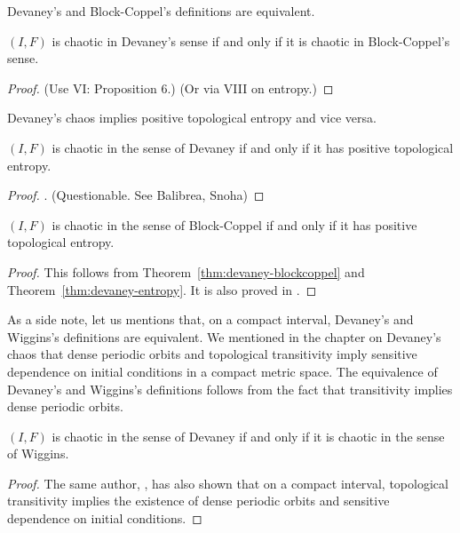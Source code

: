 \documentclass[12pt,twoside,draft]{book}
\begin{document}
Devaney's and Block-Coppel's definitions are equivalent.
\begin{theorem}
  \citep{aulbach}
  $(I,F)$ is chaotic in Devaney's sense if and only if it is chaotic in Block-Coppel's sense.
  \begin{proof}
    \citep{aulbach}
    (Use \citep{blockcoppel} VI: Proposition 6.)
    (Or via \citep{blockcoppel} VIII on entropy.)
  \end{proof}
  \label{thm:devaney-blockcoppel}
\end{theorem}

Devaney's chaos implies positive topological entropy and vice versa.
\begin{theorem}
  \citep{forti}
  $(I,F)$ is chaotic in the sense of Devaney if and only if it has positive topological entropy.
  \label{thm:devaney-entropy}
  \begin{proof}
    \citet{omegachaos}. (Questionable. See Balibrea, Snoha)
  \end{proof}
\end{theorem}

\begin{theorem}
  $(I,F)$ is chaotic in the sense of Block-Coppel if and only if it has positive topological entropy.
  \label{thm:entropy-blockcoppel}
  \begin{proof}
    This follows from Theorem~\ref{thm:devaney-blockcoppel} and Theorem~\ref{thm:devaney-entropy}.
    It is also proved in \citet[VII, Theorem 24]{blockcoppel}.
  \end{proof}
\end{theorem}

As a side note, let us mentions that, on a compact interval, Devaney's and Wiggins's definitions are equivalent.
We mentioned in the chapter on Devaney's chaos that dense periodic orbits and topological transitivity imply sensitive dependence on initial conditions in a compact metric space.
The equivalence of Devaney's and Wiggins's definitions follows from the fact that transitivity implies dense periodic orbits.
\begin{theorem}
  $(I,F)$ is chaotic in the sense of Devaney if and only if it is chaotic in the sense of Wiggins.
  \label{thm:devaney-wiggins}
  \begin{proof}
    The same author, \citet{silverman}, has also shown that on a compact interval, topological transitivity implies the existence of dense periodic orbits and sensitive dependence on initial conditions.
  \end{proof}
\end{theorem}
\end{document}
